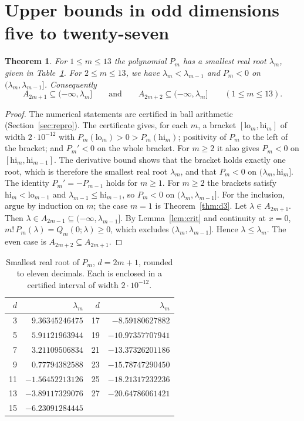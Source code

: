 \documentclass[11pt]{article}
\newtheorem{theorem}{Theorem}
\theoremstyle{remark}
\begin{document}
\section{Upper bounds in odd dimensions five to twenty-seven}
\begin{theorem}\label{thm:upper}
For $1\le m\le13$ the polynomial $P_m$ has a smallest real root $\lambda_m$, given in
Table~\ref{tab:roots}. For $2\le m\le13$, we have $\lambda_m<\lambda_{m-1}$ and $P_m<0$ on
$(\lambda_m,\lambda_{m-1}]$. Consequently
\[
 A_{2m+1}\subseteq(-\infty,\lambda_m]\qquad\text{and}\qquad A_{2m+2}\subseteq(-\infty,\lambda_m]
 \qquad(1\le m\le13).
\]
\end{theorem}
\begin{proof}
The numerical statements are certified in ball arithmetic (Section~\ref{sec:repro}). The
certificate gives, for each $m$, a bracket $[\mathrm{lo}_m,\mathrm{hi}_m]$ of width $2\cdot10^{-12}$
with $P_m(\mathrm{lo}_m)>0>P_m(\mathrm{hi}_m)$; positivity of $P_m$ to the left of the bracket;
and $P_m'<0$ on the whole bracket. For $m\ge2$ it also gives $P_m<0$ on $[\mathrm{hi}_m,\mathrm{hi}_{m-1}]$. The derivative
bound shows that the bracket holds exactly one root, which is therefore the smallest real root
$\lambda_m$, and that $P_m<0$ on $(\lambda_m,\mathrm{hi}_m]$. The identity $P_m'=-P_{m-1}$ holds for $m\ge1$. For $m\ge2$ the brackets satisfy
$\mathrm{hi}_m<\mathrm{lo}_{m-1}$ and $\lambda_{m-1}\le\mathrm{hi}_{m-1}$, so
$P_m<0$ on $(\lambda_m,\lambda_{m-1}]$.
For the inclusion, argue by induction on $m$; the case $m=1$ is Theorem~\ref{thm:d3}. Let
$\lambda\in A_{2m+1}$. Then $\lambda\in A_{2m-1}\subseteq(-\infty,\lambda_{m-1}]$. By
Lemma~\ref{lem:crit} and continuity at $x=0$, $m!\,P_m(\lambda)=Q_m(0;\lambda)\ge0$, which
excludes $(\lambda_m,\lambda_{m-1}]$. Hence $\lambda\le\lambda_m$. The even case is
$A_{2m+2}\subseteq A_{2m+1}$.
\end{proof}

\begin{table}[h]\centering
\begin{tabular}{rr@{\qquad}rr}
\toprule
$d$ & $\lambda_m$ & $d$ & $\lambda_m$\\
\midrule
3 & $9.36345246475$ & 17 & $-8.59180627882$\\
5 & $5.91121963944$ & 19 & $-10.97357707941$\\
7 & $3.21109506834$ & 21 & $-13.37326201186$\\
9 & $0.77794382588$ & 23 & $-15.78747290450$\\
11 & $-1.56452213126$ & 25 & $-18.21317232236$\\
13 & $-3.89117329076$ & 27 & $-20.64786061421$\\
15 & $-6.23091284445$ & & \\
\bottomrule
\end{tabular}
\caption{Smallest real root of $P_m$, $d=2m+1$, rounded to eleven decimals. Each is enclosed in
a certified interval of width $2\cdot10^{-12}$.}\label{tab:roots}
\end{table}
\end{document}
